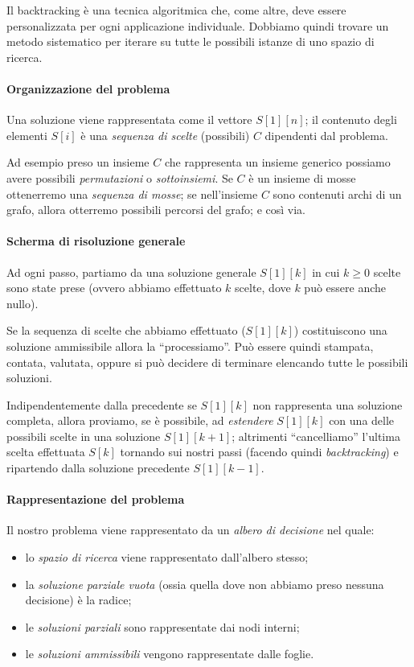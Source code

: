 Il backtracking è una tecnica algoritmica che, come altre, deve essere personalizzata per ogni applicazione individuale.
Dobbiamo quindi trovare un metodo sistematico per iterare su tutte le possibili istanze di uno spazio di ricerca.

\paragraph{Organizzazione del problema}
Una soluzione viene rappresentata come il vettore \(S[1][n]\);
il contenuto degli elementi \(S[i]\) è una \emph{sequenza di scelte} (possibili) \(C\) dipendenti dal problema.

Ad esempio preso un insieme \(C\) che rappresenta un insieme generico possiamo avere possibili \emph{permutazioni} o \emph{sottoinsiemi}.
Se \(C\) è un insieme di mosse ottenerremo una \emph{sequenza di mosse};
se nell'insieme \(C\) sono contenuti archi di un grafo, allora otterremo possibili percorsi del grafo; e così via.

\paragraph{Scherma di risoluzione generale}
Ad ogni passo, partiamo da una soluzione generale \(S[1][k]\) in cui \(k \geqslant 0\) scelte sono state prese (ovvero abbiamo effettuato \(k\) scelte, dove \(k\) può essere anche nullo).

Se la sequenza di scelte che abbiamo effettuato (\(S[1][k]\)) costituiscono una soluzione ammissibile allora la \enquote{processiamo}.
Può essere quindi stampata, contata, valutata, oppure si può decidere di terminare elencando tutte le possibili soluzioni.

Indipendentemente dalla precedente se \(S[1][k]\) non rappresenta una soluzione completa, allora proviamo, se è possibile, ad \emph{estendere} \(S[1][k]\) con una delle possibili scelte in una soluzione \(S[1][k+1]\);
altrimenti \enquote{cancelliamo} l'ultima scelta effettuata \(S[k]\) tornando sui nostri passi (facendo quindi \emph{backtracking}) e ripartendo dalla soluzione precedente \(S[1][k-1]\).

\paragraph{Rappresentazione del problema}
Il nostro problema viene rappresentato da un \emph{albero di decisione} nel quale:
\begin{itemize}
	\item lo \emph{spazio di ricerca} viene rappresentato dall'albero stesso;
	\item la \emph{soluzione parziale vuota} (ossia quella dove non abbiamo preso nessuna decisione) è la radice;
	\item le \emph{soluzioni parziali} sono rappresentate dai nodi interni;
	\item le \emph{soluzioni ammissibili} vengono rappresentate dalle foglie.
\end{itemize}

